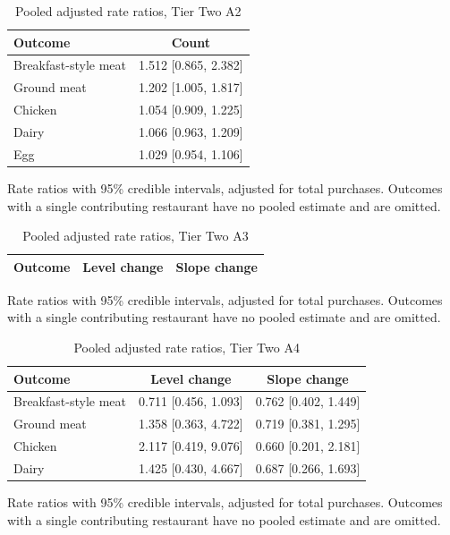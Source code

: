 \begin{table}[H]
\centering
\caption{Pooled adjusted rate ratios, Tier Two A2}
\label{tab:rr_t2_a2}
\begin{tabular}{lc}
\toprule
Outcome & Count \\
\midrule
Breakfast-style meat & 1.512 [0.865, 2.382] \\
Ground meat & 1.202 [1.005, 1.817] \\
Chicken & 1.054 [0.909, 1.225] \\
Dairy & 1.066 [0.963, 1.209] \\
Egg & 1.029 [0.954, 1.106] \\
\bottomrule
\end{tabular}
\par\smallskip\footnotesize Rate ratios with 95\% credible intervals, adjusted for total purchases. Outcomes with a single contributing restaurant have no pooled estimate and are omitted.
\end{table}

\begin{table}[H]
\centering
\caption{Pooled adjusted rate ratios, Tier Two A3}
\label{tab:rr_t2_a3}
\begin{tabular}{lcc}
\toprule
Outcome & Level change & Slope change \\
\midrule
\bottomrule
\end{tabular}
\par\smallskip\footnotesize Rate ratios with 95\% credible intervals, adjusted for total purchases. Outcomes with a single contributing restaurant have no pooled estimate and are omitted.
\end{table}

\begin{table}[H]
\centering
\caption{Pooled adjusted rate ratios, Tier Two A4}
\label{tab:rr_t2_a4}
\begin{tabular}{lcc}
\toprule
Outcome & Level change & Slope change \\
\midrule
Breakfast-style meat & 0.711 [0.456, 1.093] & 0.762 [0.402, 1.449] \\
Ground meat & 1.358 [0.363, 4.722] & 0.719 [0.381, 1.295] \\
Chicken & 2.117 [0.419, 9.076] & 0.660 [0.201, 2.181] \\
Dairy & 1.425 [0.430, 4.667] & 0.687 [0.266, 1.693] \\
\bottomrule
\end{tabular}
\par\smallskip\footnotesize Rate ratios with 95\% credible intervals, adjusted for total purchases. Outcomes with a single contributing restaurant have no pooled estimate and are omitted.
\end{table}

